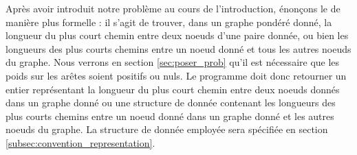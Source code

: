 
Après avoir introduit notre problème au cours de l'introduction, énonçons le de manière plus formelle : il s'agit de trouver, dans un graphe pondéré donné, la longueur du plus court chemin entre deux noeuds d'une paire donnée, ou bien les longueurs des plus courts chemins entre un noeud donné et tous les autres noeuds du graphe. Nous verrons en section \ref{sec:poser_prob} qu'il est nécessaire que les poids sur les arêtes soient positifs ou nuls. Le programme doit donc retourner un entier représentant la longueur du plus court chemin entre deux noeuds donnés dans un graphe donné ou une structure de donnée contenant les longueurs des plus courts chemins entre un noeud donné dans un graphe donné et les autres noeuds du graphe. La structure de donnée employée sera spécifiée en section \ref{subsec:convention_representation}.